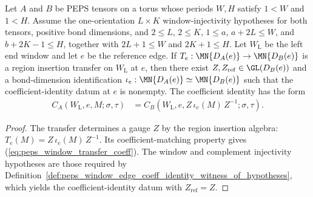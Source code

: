 \begin{lemma}%
    \label{thm:peps_windowEdgeCoeffIdentityWitness_of_transfer}
    \leanok
    Let $A$ and $B$ be PEPS tensors on a torus whose periods $W,H$ satisfy
    $1<W$ and $1<H$. Assume the one-orientation $L\times K$
    window-injectivity hypotheses for both tensors, positive bond dimensions, and
    $2\le L$, $2\le K$, $1\le a$, $a+2L\le W$, and $b+2K-1\le H$,
    together with $2L+1\le W$ and $2K+1\le H$.
    Let $W_{\mathrm L}$ be the left end window and let $e$ be the reference
    edge. If $T_e:\MN{D_A(e)}\to\MN{D_B(e)}$ is a region insertion transfer
    on $W_{\mathrm L}$ at $e$, then there exist
    $Z,Z_{\mathrm{ref}}\in\GL(D_B(e))$ and a bond-dimension identification
    $\iota_e:\MN{D_A(e)}\simeq\MN{D_B(e)}$ such that the coefficient-identity
    datum at $e$ is nonempty. The coefficient identity has the form
    \begin{align}
        C_A(W_{\mathrm L},e,M;\sigma,\tau)
         & =
        C_B(W_{\mathrm L},e,Z\,\iota_e(M)\,Z^{-1};\sigma,\tau).
        \label{eq:peps_window_transfer_coeff}
    \end{align}
\end{lemma}
\begin{proof}
    \leanok
    The transfer determines a gauge $Z$ by the region insertion algebra:
    $T_e(M)=Z\,\iota_e(M)\,Z^{-1}$. Its coefficient-matching property
    gives (\ref{eq:peps_window_transfer_coeff}). The window and complement
    injectivity hypotheses are those required by
    Definition~\ref{def:peps_window_edge_coeff_identity_witness_of_hypotheses},
    which yields the coefficient-identity datum with $Z_{\mathrm{ref}}=Z$.
\end{proof}

